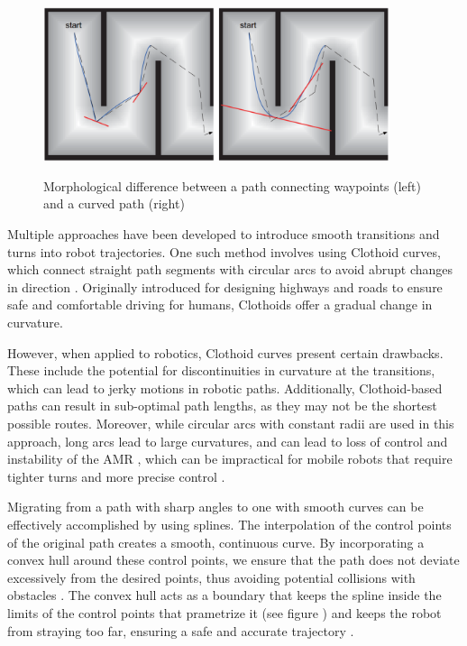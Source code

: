 \begin{figure}[H]
    \begin{center}
        \includegraphics[width=4in]{images/Chap2/sharp-vs-curved-path.png}\\
        \caption{Morphological difference between a path connecting waypoints (left) and a curved path 
        (right) \cite{R30}}
        \label{paths}
    \end{center}
\end{figure}

Multiple approaches have been developed to introduce smooth transitions and turns into robot trajectories. 
One such method involves using Clothoid curves, which connect straight path segments with circular arcs 
to avoid abrupt changes in direction \cite{R31}. Originally introduced for designing highways and roads to 
ensure safe and comfortable driving for humans, Clothoids offer a gradual change in curvature.

However, when applied to robotics, Clothoid curves present certain drawbacks. These include the potential 
for discontinuities in curvature at the transitions, which can lead to jerky motions in robotic paths. 
Additionally, Clothoid-based paths can result in sub-optimal path lengths, as they may not be the shortest 
possible routes. Moreover, while circular arcs with constant radii are used in this approach, long
arcs lead to large curvatures, and can lead to loss of control and instability of the AMR , which can 
be impractical for mobile robots that require tighter turns 
and more precise control \cite{R31}.

Migrating from a path with sharp angles to one with smooth curves can be effectively accomplished by 
using splines. The interpolation of the control points of the original path 
creates a smooth, continuous curve. By incorporating a convex hull around these control points, we 
ensure that the path does not deviate excessively from the desired points, thus avoiding potential 
collisions with obstacles \cite{R33}. The convex hull acts as a boundary that keeps the spline inside the limits of 
the control points that prametrize it (see figure ) and keeps the robot from straying 
too far, ensuring a safe and accurate trajectory \cite{R29}.

